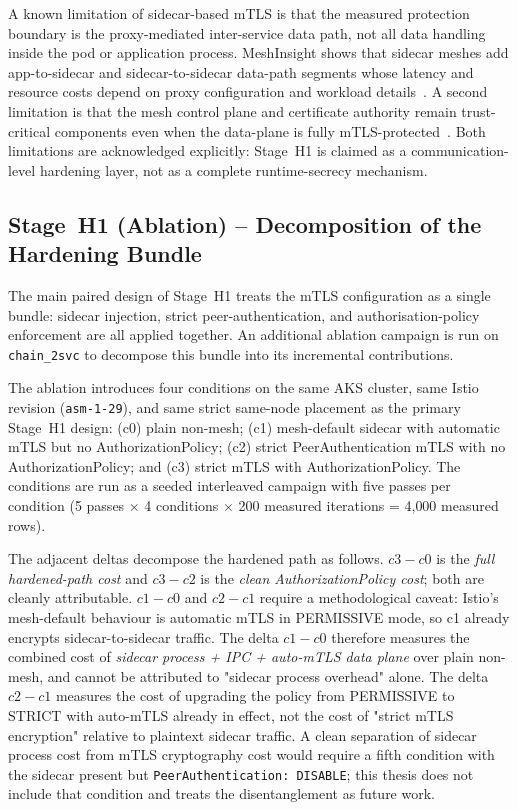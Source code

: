 A known limitation of sidecar-based mTLS is that the measured protection boundary is the
proxy-mediated inter-service data path, not all data handling inside the pod or
application process.
MeshInsight shows that sidecar meshes add app-to-sidecar and sidecar-to-sidecar data-path
segments whose latency and resource costs depend on proxy configuration and workload
details~\cite{meshinsight_socc23}.
A second limitation is that the mesh control plane and certificate authority remain
trust-critical components even when the data-plane is fully mTLS-protected~\cite{poudel2025mazu}.
Both limitations are acknowledged explicitly: Stage~H1 is claimed as a communication-level
hardening layer, not as a complete runtime-secrecy mechanism.

\subsection{Stage~H1 (Ablation) -- Decomposition of the Hardening Bundle}
\label{sec:methods-rq21-ablation}

The main paired design of Stage~H1 treats the mTLS configuration as a single bundle: sidecar
injection, strict peer-authentication, and authorisation-policy enforcement are all applied
together. An additional ablation campaign is run on \texttt{chain\_2svc} to decompose this
bundle into its incremental contributions.

The ablation introduces four conditions on the same AKS cluster, same Istio revision
(\texttt{asm-1-29}), and same strict same-node placement as the primary Stage~H1 design:
(c0) plain non-mesh; (c1) mesh-default sidecar with automatic mTLS but no AuthorizationPolicy;
(c2) strict PeerAuthentication mTLS with no AuthorizationPolicy; and (c3) strict mTLS with
AuthorizationPolicy. The conditions are run as a seeded interleaved campaign with five
passes per condition (5 passes $\times$ 4 conditions $\times$ 200 measured iterations =
4{,}000 measured rows).

The adjacent deltas decompose the hardened path as follows. $c3-c0$ is the
\emph{full hardened-path cost} and $c3-c2$ is the \emph{clean AuthorizationPolicy cost}; both are
cleanly attributable. $c1-c0$ and $c2-c1$ require a methodological caveat: Istio's
mesh-default behaviour is automatic mTLS in PERMISSIVE mode, so c1 already encrypts
sidecar-to-sidecar traffic. The delta $c1-c0$ therefore measures the combined cost of
\emph{sidecar process + IPC + auto-mTLS data plane} over plain non-mesh, and cannot be
attributed to "sidecar process overhead" alone. The delta $c2-c1$ measures the cost of
upgrading the policy from PERMISSIVE to STRICT with auto-mTLS already in effect, not the
cost of "strict mTLS encryption" relative to plaintext sidecar traffic. A clean separation
of sidecar process cost from mTLS cryptography cost would require a fifth condition with
the sidecar present but \texttt{PeerAuthentication: DISABLE}; this thesis does not include
that condition and treats the disentanglement as future work.

